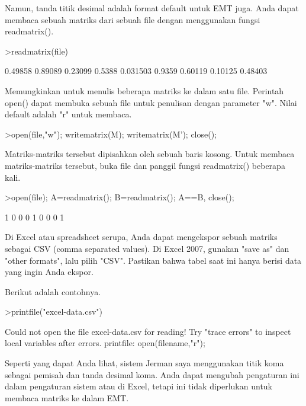 \documentclass[a4paper,10pt]{article}
\begin{document}
\begin{eulernotebook}
\begin{eulercomment}
\begin{eulercomment}
\begin{eulercomment}
\begin{eulercomment}
\begin{eulercomment}
\begin{eulercomment}
\begin{eulercomment}
Namun, tanda titik desimal adalah format default untuk EMT juga. Anda
dapat membaca sebuah matriks dari sebuah file dengan menggunakan
fungsi readmatrix().
\end{eulercomment}
\begin{eulerprompt}
>readmatrix(file)
\end{eulerprompt}
\begin{euleroutput}
    0.49858   0.89089   0.23099 
     0.5388  0.031503    0.9359 
    0.60119   0.10125   0.48403 
\end{euleroutput}
\begin{eulercomment}
Memungkinkan untuk menulis beberapa matriks ke dalam satu file.
Perintah open() dapat membuka sebuah file untuk penulisan dengan
parameter "w". Nilai default adalah "r" untuk membaca.
\end{eulercomment}
\begin{eulerprompt}
>open(file,"w"); writematrix(M); writematrix(M'); close();
\end{eulerprompt}
\begin{eulercomment}
Matriks-matriks tersebut dipisahkan oleh sebuah baris kosong. Untuk
membaca matriks-matriks tersebut, buka file dan panggil fungsi
readmatrix() beberapa kali.
\end{eulercomment}
\begin{eulerprompt}
>open(file); A=readmatrix(); B=readmatrix(); A==B, close();
\end{eulerprompt}
\begin{euleroutput}
          1         0         0 
          0         1         0 
          0         0         1 
\end{euleroutput}
\begin{eulercomment}
Di Excel atau spreadsheet serupa, Anda dapat mengekspor sebuah matriks
sebagai CSV (comma separated values). Di Excel 2007, gunakan "save as"
dan "other formats", lalu pilih "CSV". Pastikan bahwa tabel saat ini
hanya berisi data yang ingin Anda ekspor.

Berikut adalah contohnya.
\end{eulercomment}
\begin{eulerprompt}
>printfile("excel-data.csv")
\end{eulerprompt}
\begin{euleroutput}
  Could not open the file
  excel-data.csv
  for reading!
  Try "trace errors" to inspect local variables after errors.
  printfile:
      open(filename,"r");
\end{euleroutput}
\begin{eulercomment}
Seperti yang dapat Anda lihat, sistem Jerman saya menggunakan titik
koma sebagai pemisah dan tanda desimal koma. Anda dapat mengubah
pengaturan ini dalam pengaturan sistem atau di Excel, tetapi ini tidak
diperlukan untuk membaca matriks ke dalam EMT.


\end{eulercomment}
\end{eulercomment}
\end{eulercomment}
\end{eulercomment}
\end{eulercomment}
\end{eulercomment}
\end{eulercomment}
\end{eulernotebook}
\end{document}
